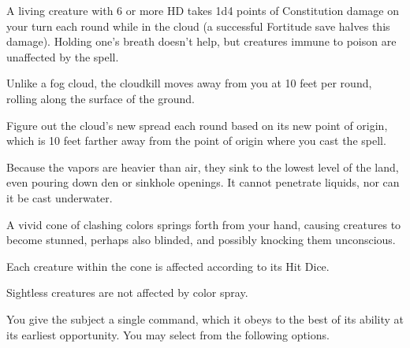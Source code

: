 \begin{multicols}{2}
\begin{small}
\smallskip\noindent A living creature with 6 or more HD takes 1d4 points of Constitution damage on your turn each round while in the cloud (a successful Fortitude save halves this damage). Holding one's breath doesn't help, but creatures immune to poison are unaffected by the spell.

\smallskip\noindent Unlike a fog cloud, the cloudkill moves away from you at 10 feet per round, rolling along the surface of the ground.

\smallskip\noindent Figure out the cloud's new spread each round based on its new point of origin, which is 10 feet farther away from the point of origin where you cast the spell.

\smallskip\noindent Because the vapors are heavier than air, they sink to the lowest level of the land, even pouring down den or sinkhole openings. It cannot penetrate liquids, nor can it be cast underwater.

\noindent A vivid cone of clashing colors springs forth from your hand, causing creatures to become stunned, perhaps also blinded, and possibly knocking them unconscious.

\smallskip\noindent Each creature within the cone is affected according to its Hit Dice.


\smallskip\noindent Sightless creatures are not affected by color spray.


\noindent You give the subject a single command, which it obeys to the best of its ability at its earliest opportunity. You may select from the following options.


\end{small}
\end{multicols}
